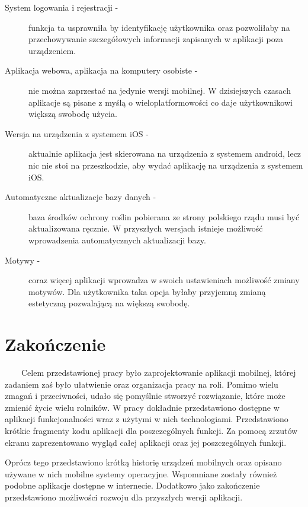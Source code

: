 \documentclass[a4paper,12pt,oneside]{book}
\begin{document}
	\begin{description}
		\item[System logowania i rejestracji -] funkcja ta usprawniła by identyfikację użytkownika oraz pozwoliłaby na przechowywanie szczegółowych informacji zapisanych w aplikacji poza urządzeniem.
		\item[Aplikacja webowa, aplikacja na komputery osobiste -] nie można zaprzestać na jedynie wersji mobilnej. W dzisiejszych czasach aplikacje są pisane z myślą o wieloplatformowości co daje użytkownikowi większą swobodę użycia.
		\item[Wersja na urządzenia z systemem iOS -] aktualnie aplikacja jest skierowana na urządzenia z systemem android, lecz nic nie stoi na przeszkodzie, aby wydać aplikację na urządzenia z systemem iOS.
		\item[Automatyczne aktualizacje bazy danych -] baza środków ochrony roślin pobierana ze strony polskiego rządu musi być aktualizowana ręcznie. W przyszłych wersjach istnieje możliwość wprowadzenia automatycznych aktualizacji bazy.
		\item[Motywy -] coraz więcej aplikacji wprowadza w swoich ustawieniach możliwość zmiany motywów. Dla użytkownika taka opcja byłaby przyjemną zmianą estetyczną pozwalającą na większą swobodę.
	\end{description}
	
	
	\section{Zakończenie}
	\ \ \ \
	Celem przedstawionej pracy było zaprojektowanie aplikacji mobilnej, której zadaniem zaś było ułatwienie oraz organizacja pracy na roli. Pomimo wielu zmagań i przeciwności, udało się pomyślnie stworzyć rozwiązanie, które może zmienić życie wielu rolników. W pracy dokładnie przedstawiono dostępne w aplikacji funkcjonalności wraz z użytymi w nich technologiami. Przedstawiono krótkie fragmenty kodu aplikacji dla poszczególnych funkcji. Za pomocą zrzutów ekranu zaprezentowano wygląd całej aplikacji oraz jej poszczególnych funkcji. 
	
	Oprócz tego przedstawiono krótką historię urządzeń mobilnych oraz opisano używane w nich mobilne systemy operacyjne. Wspomniane zostały również podobne aplikacje dostępne w internecie. Dodatkowo jako zakończenie przedstawiono możliwości rozwoju dla przyszłych wersji aplikacji.
	
	\newpage
	
	
	
	
	\lstlistoflistings
	
	\listoffigures
	
\end{document}
